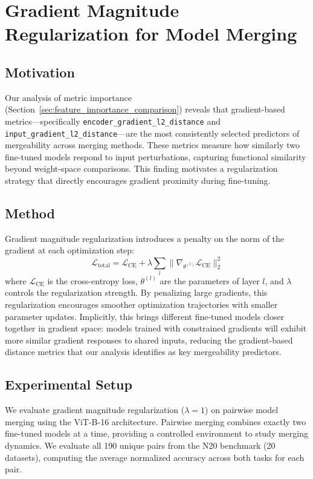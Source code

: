 \section{Gradient Magnitude Regularization for Model Merging}
\label{sec:gradient_magnitude_regularization}

\subsection{Motivation}

Our analysis of metric importance (Section~\ref{sec:feature_importance_comparison}) reveals that gradient-based metrics---specifically \texttt{encoder\_gradient\_l2\_distance} and \texttt{input\_gradient\_l2\_distance}---are the most consistently selected predictors of mergeability across merging methods. These metrics measure how similarly two fine-tuned models respond to input perturbations, capturing functional similarity beyond weight-space comparisons. This finding motivates a regularization strategy that directly encourages gradient proximity during fine-tuning.

\subsection{Method}

Gradient magnitude regularization introduces a penalty on the norm of the gradient at each optimization step:
\begin{equation}
\mathcal{L}_{\text{total}} = \mathcal{L}_{\text{CE}} + \lambda \sum_l \|\nabla_{\theta^{(l)}} \mathcal{L}_{\text{CE}}\|_2^2
\end{equation}
where $\mathcal{L}_{\text{CE}}$ is the cross-entropy loss, $\theta^{(l)}$ are the parameters of layer $l$, and $\lambda$ controls the regularization strength. By penalizing large gradients, this regularization encourages smoother optimization trajectories with smaller parameter updates. Implicitly, this brings different fine-tuned models closer together in gradient space: models trained with constrained gradients will exhibit more similar gradient responses to shared inputs, reducing the gradient-based distance metrics that our analysis identifies as key mergeability predictors.

\subsection{Experimental Setup}

We evaluate gradient magnitude regularization ($\lambda = 1$) on pairwise model merging using the ViT-B-16 architecture. Pairwise merging combines exactly two fine-tuned models at a time, providing a controlled environment to study merging dynamics. We evaluate all 190 unique pairs from the N20 benchmark (20 datasets), computing the average normalized accuracy across both tasks for each pair.

